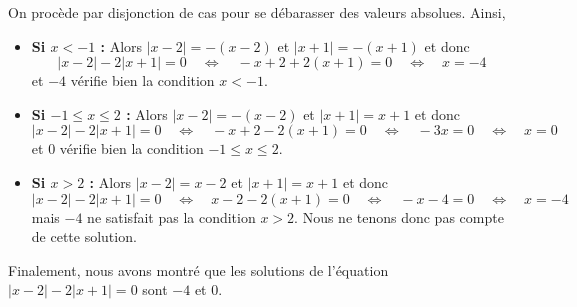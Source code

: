 On procède par disjonction de cas pour se débarasser des valeurs absolues. Ainsi,
\begin{itemize}
\item \textbf{Si $x < -1$ :} Alors $|x-2| = -(x-2)$ et $|x+1| = -(x+1)$ et donc 
\[|x-2| - 2 |x+1| = 0  \quad \Leftrightarrow \quad
-x+2 + 2 (x+1) = 0 \quad \Leftrightarrow \quad
x = -4\]
et $-4$ vérifie bien la condition $x < -1$.
\item \textbf{Si $-1 \leqslant x \leqslant 2$ :} Alors $|x-2| = -(x-2)$ et $|x+1| = x+1$ et donc 
\[|x-2| - 2 |x+1| = 0  \quad \Leftrightarrow \quad
-x+2 - 2 (x+1) = 0 \quad \Leftrightarrow \quad
-3x = 0 \quad \Leftrightarrow \quad
x = 0 \]
et $0$ vérifie bien la condition $-1 \leqslant x \leqslant 2$.
\item \textbf{Si $x > 2$ :} Alors $|x-2| = x-2$ et $|x+1| = x+1$ et donc 
\[|x-2| - 2 |x+1| = 0  \quad \Leftrightarrow \quad
x-2 - 2 (x+1) = 0 \quad \Leftrightarrow \quad
-x -4 = 0 \quad \Leftrightarrow \quad
x = -4 \]
mais $-4$ ne satisfait pas la condition $x > 2$. Nous ne tenons donc pas compte de cette solution.
\end{itemize}
Finalement, nous avons montré que les solutions de l'équation $|x-2| - 2 |x+1| = 0$ sont $-4$ et $0$.